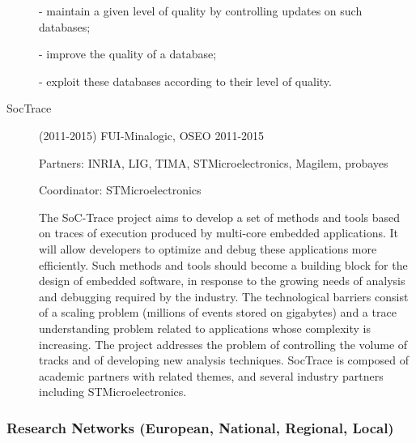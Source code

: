 \begin{description}
- maintain a given level of quality by controlling updates on such databases;

- improve the quality of a database;

- exploit these databases according to their level of quality.


\item[ SocTrace] (2011-2015)  FUI-Minalogic, OSEO 2011-2015

Partners: INRIA, LIG, TIMA, STMicroelectronics, Magilem, probayes

Coordinator: STMicroelectronics

The SoC-Trace project aims to develop a set of methods and tools based on traces of execution produced by multi-core embedded applications. It will allow developers to optimize and debug these applications more efficiently. Such methods and tools should become a building block for the design of embedded software, in response to the growing needs of analysis and debugging required by the industry. The technological barriers consist of a scaling problem (millions of events stored on gigabytes) and a trace understanding problem related to applications whose complexity is increasing. The project addresses the problem of controlling the volume of tracks and of developing new analysis techniques. SocTrace is composed of academic partners with related themes, and several industry partners including STMicroelectronics.

\end{description}

\subsubsection{Research Networks (European, National, Regional, Local)}

